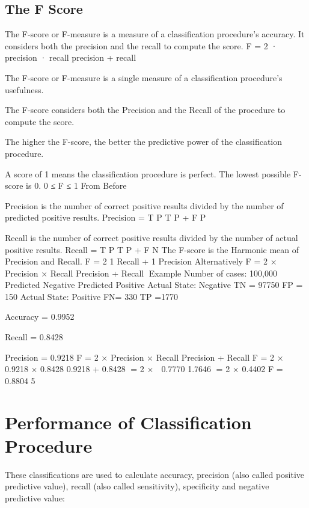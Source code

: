 \documentclass[a4paper,12pt]{article}
\begin{document}
\subsection{The F Score}
The F-score or F-measure is a measure of a classification procedure’s accuracy. It considers both
the precision and the recall to compute the score.
F = 2 ·
precision · recall
precision + recall
\item  The F-score or F-measure is a single measure of a classification procedure’s usefulness.
\item  The F-score considers both the Precision and the Recall of the procedure to compute the
score.
\item  The higher the F-score, the better the predictive power of the classification procedure.
\item  A score of 1 means the classification procedure is perfect. The lowest possible F-score is 0.
0 ≤ F ≤ 1
From Before
\item  Precision is the number of correct positive results divided by the number of predicted
positive results.
Precision = T P
T P + F P
\item  Recall is the number of correct positive results divided by the number of actual positive
results.
Recall = T P
T P + F N
The F-score is the Harmonic mean of Precision and Recall.
F =
2
1
Recall +
1
Precision
Alternatively
F = 2 ×

Precision × Recall
Precision + Recall
Example
Number of cases: 100,000
Predicted Negative Predicted Positive
Actual State: Negative TN = 97750 FP = 150
Actual State: Positive FN= 330 TP =1770
\item  Accuracy = 0.9952
\item  Recall = 0.8428
\item  Precision = 0.9218
F = 2 ×
Precision × Recall
Precision + Recall
F = 2 ×

0.9218 × 0.8428
0.9218 + 0.8428
= 2 ×

0.7770
1.7646
= 2 × 0.4402
F = 0.8804
5
\newpage

\section{Performance of Classification Procedure}
	
	These classifications are used to calculate accuracy, precision (also called positive predictive value), recall (also called sensitivity), specificity and negative predictive value:
	
\end{document}
